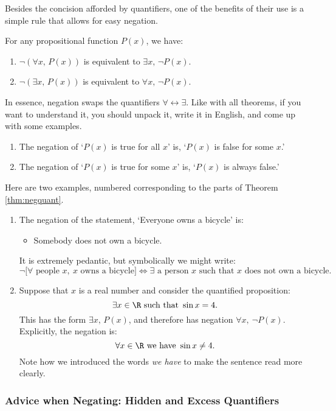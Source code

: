 Besides the concision afforded by quantifiers, one of the benefits of their use is a simple rule that allows for easy negation.

\begin{thm}\label{thm:negquant}
For any propositional function $P(x)$, we have:
\begin{enumerate}
  \item $\neg(\forall x,\, P(x))$ is equivalent to $\exists x,\, \neg P(x)$.
  \item $\neg(\exists x,\, P(x))$ is equivalent to $\forall x,\, \neg P(x)$.
\end{enumerate}
\end{thm}
In essence, negation swaps the quantifiers $\forall\leftrightarrow\exists$. Like with all theorems, if you want to understand it, you should unpack it, write it in English, and come up with some examples.
\begin{enumerate}
  \item The negation of `$P(x)$ is true for all $x$' is, `$P(x)$ is false for some $x$.'
  \item The negation of `$P(x)$ is true for some $x$' is, `$P(x)$ is always false.'
\end{enumerate}


\begin{exs}
Here are two examples, numbered corresponding to the parts of Theorem \ref{thm:negquant}.
\begin{enumerate}
	\item The negation of the statement, `Everyone owns a bicycle' is:
	\begin{itemize}
  	\item[] Somebody does not own a bicycle.
	\end{itemize}
	It is extremely pedantic, but symbolically we might write:
	\[\neg\Big[\forall\text{ people }x,\ x\text{ owns a bicycle}\Big]\iff \exists\text{ a person $x$ such that $x$ does not own a bicycle}.\]
	\item Suppose that $x$ is a real number and consider the quantified proposition:
	\[\exists x\in\R\text{ such that }\sin x=4.\]
	This has the form $\exists x,\,P(x)$, and therefore has negation $\forall x,\ \neg P(x)$. Explicitly, the negation is:
	\[\forall x\in\R\text{ we have }\sin x\neq 4.\]
	Note how we introduced the words \emph{we have} to make the sentence read more clearly.
\end{enumerate}
\end{exs}

\subsubsection*{Advice when Negating: Hidden and Excess Quantifiers}

